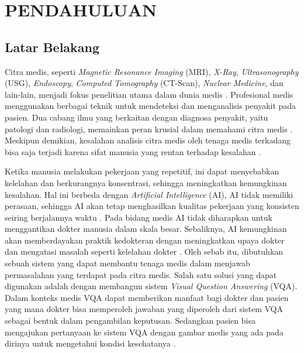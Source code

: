 

\chapter{PENDAHULUAN}


\section{Latar Belakang}

\par Citra medis, seperti \textit{Magnetic Resonance Imaging} (MRI), \textit{X-Ray}, \textit{Ultrasonography} (USG), \textit{Endoscopy}, \textit{Computed Tomography} (CT-Scan), \textit{Nuclear Medicine}, dan lain-lain, menjadi fokus penelitian utama dalam dunia medis \citep{kusuma2020penerapan}. Profesional medis menggunakan berbagai teknik untuk mendeteksi dan menganalisis penyakit pada pasien. Dua cabang ilmu yang berkaitan dengan diagnosa penyakit, yaitu patologi dan radiologi, memainkan peran krusial dalam memahami citra medis \citep{sorace2012integrating}. Meskipun demikian, kesalahan analisis citra medis oleh tenaga medis terkadang bisa saja terjadi karena sifat manusia yang rentan terhadap kesalahan \citep{mauli2018tanggung}. 


\par Ketika manusia melakukan pekerjaan yang repetitif, ini dapat menyebabkan kelelahan dan berkurangnya konsentrasi, sehingga meningkatkan kemungkinan kesalahan. Hal ini berbeda dengan \textit{Artificial Intelligence} (AI), AI tidak memiliki perasaan, sehingga AI akan tetap menghasilkan kualitas pekerjaan yang konsisten seiring berjalannya waktu \citep{fernando2019studi}. Pada bidang medis AI tidak diharapkan untuk menggantikan dokter manusia dalam skala besar. Sebaliknya, AI kemungkinan akan memberdayakan praktik kedokteran dengan meningkatkan upaya dokter dan mengatasi masalah seperti kelelahan dokter \citep{basu2020artificial}. Oleh sebab itu, dibutuhkan sebuah sistem yang dapat membantu tenaga medis dalam menjawab permasalahan yang terdapat pada citra medis. Salah satu solusi yang dapat digunakan adalah dengan membangun sistem \textit{Visual Question Answering} (VQA). Dalam konteks medis VQA dapat memberikan manfaat bagi dokter dan pasien yang mana dokter bisa memperoleh jawaban yang diperoleh dari sistem VQA sebagai bentuk dalam pengambilan keputusan. Sedangkan pasien bisa mengajukan pertanyaan ke sistem VQA dengan gambar medis yang ada pada dirinya untuk mengetahui kondisi kesehatanya \citep{aioz_mevf_miccai19}.

